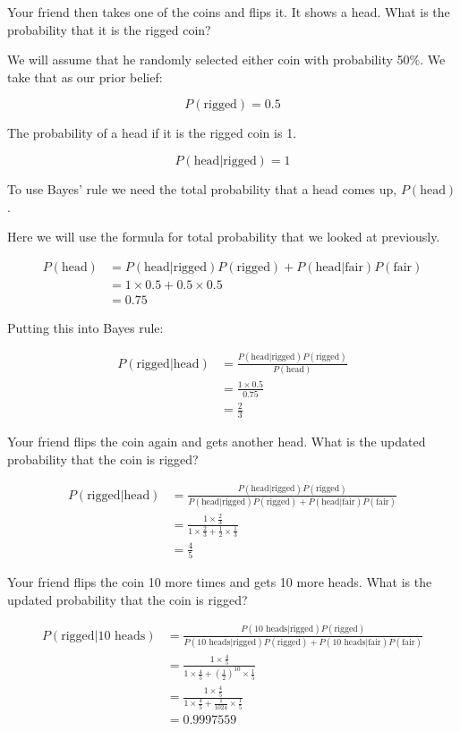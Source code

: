 \documentclass[
  letterpaper,
  DIV=11,
  numbers=noendperiod]{scrreprt}
\begin{document}
Your friend then takes one of the coins and flips it. It shows a head.
What is the probability that it is the rigged coin?

We will assume that he randomly selected either coin with probability
50\%. We take that as our prior belief:

\[
P(\text{rigged})=0.5
\]

The probability of a head if it is the rigged coin is 1.

\[
P(\text{head}|\text{rigged})=1
\]

To use Bayes' rule we need the total probability that a head comes up,
\(P(\text{head})\).

Here we will use the formula for total probability that we looked at
previously.

\begin{align*}
P(\text{head})&=P(\text{head}|\text{rigged})P(\text{rigged})+P(\text{head}|\text{fair})P(\text{fair}) \\
&=1\times 0.5+0.5\times 0.5 \\
&=0.75
\end{align*}

Putting this into Bayes rule:

\begin{align*}
P(\text{rigged}|\text{head})&=\frac{P(\text{head}|\text{rigged})P(\text{rigged})}{P(\text{head})} \\[12pt]
&=\frac{1\times 0.5}{0.75} \\
&=\frac{2}{3}
\end{align*}

Your friend flips the coin again and gets another head. What is the
updated probability that the coin is rigged?

\begin{align*}
P(\text{rigged}|\text{head})&=\frac{P(\text{head}|\text{rigged})P(\text{rigged})}{P(\text{head}|\text{rigged})P(\text{rigged})+P(\text{head}|\text{fair})P(\text{fair})} \\[12pt]
&=\frac{1\times \frac{2}{3}}{1\times\frac{2}{3}+\frac{1}{2}\times\frac{1}{3}} \\
&=\frac{4}{5}
\end{align*}

Your friend flips the coin 10 more times and gets 10 more heads. What is
the updated probability that the coin is rigged?

\begin{align*}
P(\text{rigged}|\text{10 heads})&=\frac{P(\text{10 heads}|\text{rigged})P(\text{rigged})}{P(\text{10 heads}|\text{rigged})P(\text{rigged})+P(\text{10 heads}|\text{fair})P(\text{fair})} \\[12pt]
&=\frac{1\times \frac{4}{5}}{1\times\frac{4}{5}+(\frac{1}{2})^{10}\times\frac{1}{5}} \\[6pt]
&=\frac{1\times \frac{4}{5}}{1\times\frac{4}{5}+\frac{1}{1024}\times\frac{1}{5}} \\[6pt]
&=0.9997559
\end{align*}
\end{document}
